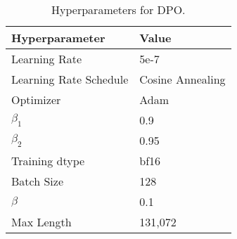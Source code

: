 \begin{table}[h]
    \centering
    \caption{Hyperparameters for DPO.}
    \small
    \begin{tabular}{l|l}
        \toprule
        \textbf{Hyperparameter} & \textbf{Value} \\
        \midrule
        Learning Rate & 5e-7 \\
        Learning Rate Schedule & Cosine Annealing \\
        Optimizer & Adam \\
        $\beta_1$ & 0.9 \\
        $\beta_2$ & 0.95 \\
        Training dtype & bf16 \\
        Batch Size & 128 \\
        $\beta$ & 0.1 \\
        Max Length & 131,072 \\
        \bottomrule
    \end{tabular}
    \label{tab:hyperparameters_dpo}
\end{table}